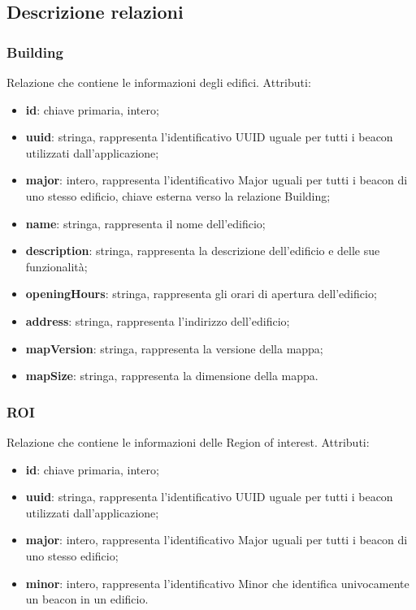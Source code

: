 \documentclass[../ManualeSviluppatore.tex]{subfiles}
\begin{document}
	\subsection{Descrizione relazioni}
		\subsubsection{Building}
		Relazione che contiene le informazioni degli edifici. Attributi:
		\begin{itemize}
			\item \textbf{id}: chiave primaria, intero;
			\item \textbf{uuid}: stringa, rappresenta l'identificativo UUID uguale per tutti i \gls{beacon} utilizzati dall'applicazione;
			\item \textbf{major}: intero, rappresenta l'identificativo Major uguali per tutti i \gls{beacon} di uno stesso edificio, chiave esterna verso la relazione Building;
			\item \textbf{name}: stringa, rappresenta il nome dell'edificio;
			\item \textbf{description}: stringa, rappresenta la descrizione dell'edificio e delle sue funzionalità;
			\item \textbf{openingHours}: stringa, rappresenta gli orari di apertura dell'edificio;
			\item \textbf{address}: stringa, rappresenta l'indirizzo dell'edificio;
			\item \textbf{mapVersion}: stringa, rappresenta la versione della mappa;
			\item \textbf{mapSize}: stringa, rappresenta la dimensione della mappa.
		\end{itemize}
		\subsubsection{ROI}
		Relazione che contiene le informazioni delle Region of interest. Attributi:
			\begin{itemize}
			\item \textbf{id}: chiave primaria, intero;
			\item \textbf{uuid}: stringa, rappresenta l'identificativo UUID uguale per tutti i \gls{beacon} utilizzati dall'applicazione;
			\item \textbf{major}: intero, rappresenta l'identificativo Major uguali per tutti i \gls{beacon} di uno stesso edificio;
			\item \textbf{minor}: intero, rappresenta l'identificativo Minor che identifica univocamente un \gls{beacon} in un edificio.
			\end{itemize}
\end{document}
